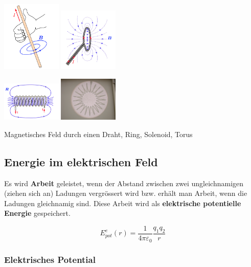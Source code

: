 \documentclass[7pt]{article}
\begin{document}
\begin{multicols*}{3}
\begin{center}
	\begin{center}
		\includegraphics[width=80pt]{images/mf/draht}
		\includegraphics[width=80pt]{images/mf/ring}
	\end{center}
	\begin{center}
		\includegraphics[width=80pt]{images/mf/solenoid}
		\includegraphics[width=80pt]{images/mf/torus}
	\end{center}
Magnetisches Feld durch einen Draht, Ring, Solenoid, Torus
\end{center}

\subsection{Energie im elektrischen Feld}

Es wird \textbf{Arbeit} geleistet, wenn der Abstand zwischen zwei ungleichnamigen (ziehen sich an) Ladungen vergr{\"o}ssert wird bzw. erh{\"a}lt man Arbeit, wenn die Ladungen gleichnamig sind. Diese Arbeit wird als \textbf{elektrische potentielle Energie} gespeichert.

\begin{equation*}
	E^e_{pot}(r) = \frac{1}{4\pi\varepsilon_0}\frac{q_1q_2}{r}
\end{equation*}

\subsubsection{Elektrisches Potential}


\end{multicols*}
\end{document}
